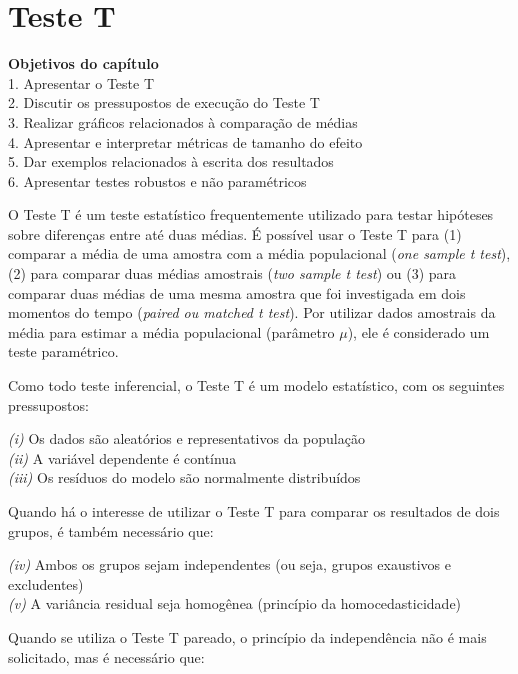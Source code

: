 \documentclass[
]{book}
\newenvironment{objectives}{
  \definecolor{shadecolor}{rgb}{0, 0, 0}  %
  \color{white}
  \begin{shaded}}
 {\end{shaded}}
\begin{document}
\hypertarget{teste-t}{%
\chapter{Teste T}\label{teste-t}}

\begin{objectives}
\textbf{Objetivos do capítulo}\\
1. Apresentar o Teste T\\
2. Discutir os pressupostos de execução do Teste T\\
3. Realizar gráficos relacionados à comparação de médias\\
4. Apresentar e interpretar métricas de tamanho do efeito\\
5. Dar exemplos relacionados à escrita dos resultados\\
6. Apresentar testes robustos e não paramétricos

\end{objectives}

O Teste T é um teste estatístico frequentemente utilizado para testar hipóteses sobre diferenças entre até duas médias. É possível usar o Teste T para (1) comparar a média de uma amostra com a média populacional (\emph{one sample t test}), (2) para comparar duas médias amostrais (\emph{two sample t test}) ou (3) para comparar duas médias de uma mesma amostra que foi investigada em dois momentos do tempo (\emph{paired ou matched t test}). Por utilizar dados amostrais da média para estimar a média populacional (parâmetro \(\mu\)), ele é considerado um teste paramétrico.

Como todo teste inferencial, o Teste T é um modelo estatístico, com os seguintes pressupostos:

\emph{(i)} Os dados são aleatórios e representativos da população\\
\emph{(ii)} A variável dependente é contínua\\
\emph{(iii)} Os resíduos do modelo são normalmente distribuídos

Quando há o interesse de utilizar o Teste T para comparar os resultados de dois grupos, é também necessário que:

\emph{(iv)} Ambos os grupos sejam independentes (ou seja, grupos exaustivos e excludentes)\\
\emph{(v)} A variância residual seja homogênea (princípio da homocedasticidade)

Quando se utiliza o Teste T pareado, o princípio da independência não é mais solicitado, mas é necessário que:
\end{document}
